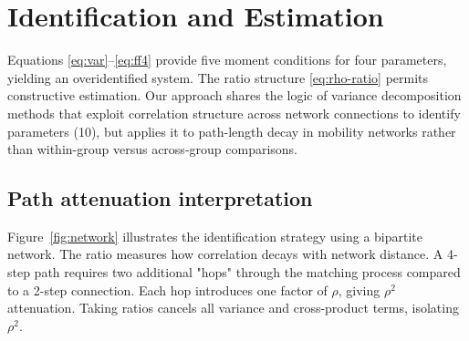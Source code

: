 \documentclass[9pt,twocolumn,twoside]{pnas-new}
\begin{document}
\section*{Identification and Estimation}

Equations \eqref{eq:var}--\eqref{eq:ff4} provide five moment conditions for four parameters, yielding an overidentified system. The ratio structure \eqref{eq:rho-ratio} permits constructive estimation. Our approach shares the logic of variance decomposition methods that exploit correlation structure across network connections to identify parameters (10), but applies it to path-length decay in mobility networks rather than within-group versus across-group comparisons.

\subsection*{Path attenuation interpretation}
Figure~\ref{fig:network} illustrates the identification strategy using a bipartite network. The ratio measures how correlation decays with network distance. A 4-step path requires two additional "hops" through the matching process compared to a 2-step connection. Each hop introduces one factor of $\rho$, giving $\rho^2$ attenuation. Taking ratios cancels all variance and cross-product terms, isolating $\rho^2$.
\end{document}
